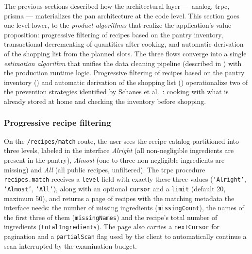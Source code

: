 The previous sections described how the architectural layer --- \gls{analog}, \acrshort{trpc}, \gls{prisma} --- materializes the \gls{pan} architecture at the code level. This section goes one level lower, to the \textit{product algorithms} that realize the application's value proposition: progressive filtering of recipes based on the pantry inventory, transactional decrementing of quantities after cooking, and automatic derivation of the shopping list from the planned slots. The three flows converge into a single \textit{estimation algorithm} that unifies the data cleaning pipeline (described in ) with the production runtime logic.
Progressive filtering of recipes based on the pantry inventory () and automatic derivation of the shopping list () operationalize two of the prevention strategies identified by Schanes et al.~\cite{schanes2018}: cooking with what is already stored at home and checking the inventory before shopping.

\subsubsection{Progressive recipe filtering}\label{subsec:filtru-progresiv}

On the \texttt{/recipes/match} route, the user sees the recipe catalog partitioned into three levels, labeled in the interface \textit{Alright} (all non-negligible ingredients are present in the pantry), \textit{Almost} (one to three non-negligible ingredients are missing) and \textit{All} (all public recipes, unfiltered). The \gls{trpc} procedure \texttt{recipes.match} receives a \texttt{level} field with exactly these three values (\texttt{'Alright'}, \texttt{'Almost'}, \texttt{'All'}), along with an optional \texttt{cursor} and a \texttt{limit} (default 20, maximum 50), and returns a page of recipes with the matching metadata the interface needs: the number of missing ingredients (\texttt{missingCount}), the names of the first three of them (\texttt{missingNames}) and the recipe's total number of ingredients (\texttt{totalIngredients}). The page also carries a \texttt{nextCursor} for pagination and a \texttt{partialScan} flag used by the client to automatically continue a scan interrupted by the examination budget.

